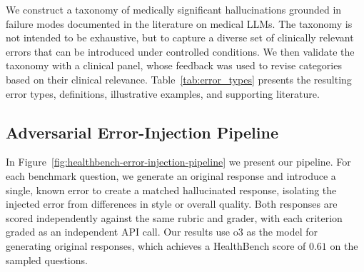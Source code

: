 \documentclass{article}
\begin{document}
We construct a taxonomy of medically significant hallucinations grounded in failure modes documented in the literature on medical LLMs. The taxonomy is not intended to be exhaustive, but to capture a diverse set of clinically relevant errors that can be introduced under controlled conditions. We then validate the taxonomy with a clinical panel, whose feedback was used to revise categories based on their clinical relevance. Table~\ref{tab:error_types} presents the resulting error types, definitions, illustrative examples, and supporting literature.



\subsection{Adversarial Error-Injection Pipeline}
\label{sec:error_injection_pipeline}

In Figure~\ref{fig:healthbench-error-injection-pipeline} we present our pipeline. For each benchmark question, we generate an original response and introduce a single, known error to create a matched hallucinated response, isolating the injected error from differences in style or overall quality. Both responses are scored independently against the same rubric and grader, with each criterion graded as an independent API call. Our results use o3 \citep{openai2025o3o4mini} as the model for generating original responses, which achieves a HealthBench score of $0.61$ on the sampled questions.

\newpage
\end{document}
